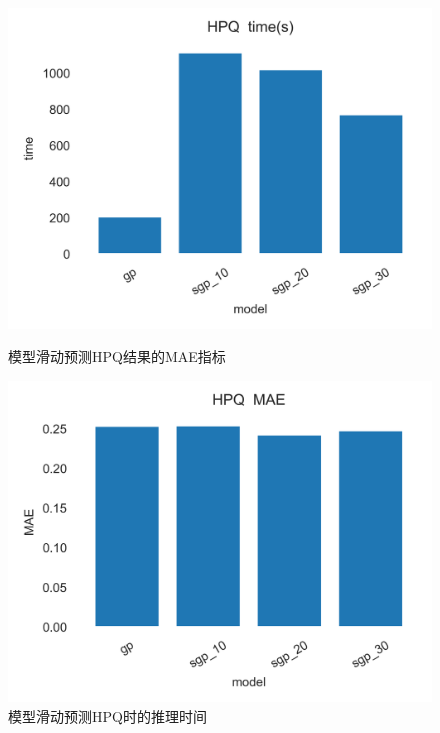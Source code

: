 \begin{figure}[!htbp]
    \centering
    \begin{minipage}[t]{0.49\textwidth}
    \centering
    \includegraphics[width=\textwidth]{images/lab3/HPQ_time.png}
    \caption{模型滑动预测HPQ结果的MAE指标}\label{3HPQtime}
    \end{minipage}
    \begin{minipage}[t]{0.49\textwidth}
    \centering
    \includegraphics[width=\textwidth]{images/lab3/HPQ_MAE.png}
    \caption{模型滑动预测HPQ时的推理时间}\label{3HPQMAE}
    \end{minipage}
\end{figure}

